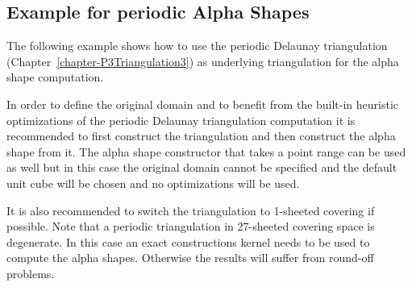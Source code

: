 \subsection{Example for periodic
  Alpha Shapes\label{l1_SectPeriodicAS3D}}

The following example shows how to use the periodic Delaunay
triangulation (Chapter~\ref{chapter-P3Triangulation3}) as underlying
triangulation for the alpha shape computation.

In order to define the original domain and to benefit from the
built-in heuristic optimizations of the periodic Delaunay
triangulation computation it is recommended to first construct the
triangulation and then construct the alpha shape from it. The alpha
shape constructor that takes a point range can be used as well but in
this case the original domain cannot be specified and the default unit
cube will be chosen and no optimizations will be used.

It is also recommended to switch the triangulation to 1-sheeted
covering if possible. Note that a periodic triangulation in 27-sheeted
covering space is degenerate. In this case an exact constructions
kernel needs to be used to compute the alpha shapes. Otherwise the
results will suffer from round-off problems.



